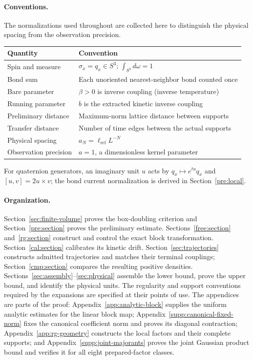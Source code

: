\paragraph{Conventions.}
The normalizations used throughout are collected here to distinguish the
physical spacing from the observation precision.
\begin{center}
\begin{tabular}{@{}ll@{}}
\toprule
Quantity & Convention\\
\midrule
Spin and measure & $\sigma_x=q_x\in S^3$; $\int_{S^3}d\omega=1$\\
Bond sum & Each unoriented nearest-neighbor bond counted once\\
Bare parameter & $\beta>0$ is inverse coupling (inverse temperature)\\
Running parameter & $b$ is the extracted kinetic inverse coupling\\
Preliminary distance & Maximum-norm lattice distance between supports\\
Transfer distance & Number of time edges between the actual supports\\
Physical spacing & $a_N=\ell_{\mathrm{ref}}L^{-N}$\\
Observation precision & $a=1$, a dimensionless kernel parameter\\
\bottomrule
\end{tabular}
\end{center}
For quaternion generators, an imaginary unit $u$ acts by
$q_x\mapsto e^{tu}q_x$ and $[u,v]=2u\times v$; the bond current
normalization is derived in Section~\ref{pre:local}.

\paragraph{Organization.}
Section~\ref{sec:finite-volume} proves the box-doubling criterion and
Section~\ref{pre:section} proves the preliminary estimate.
Sections~\ref{free:section} and~\ref{rg:section} construct and control
the exact block transformation. Section~\ref{cal:section} calibrates
its kinetic drift. Section~\ref{sec:trajectories} constructs admitted trajectories
and matches their terminal couplings; Section~\ref{cmp:section} compares the resulting
positive densities. Sections~\ref{sec:assembly}--\ref{sec:physical}
assemble the lower bound, prove the upper bound, and identify the
physical units. The regularity and support conventions required by the expansions are
specified at their points of use. The appendices are parts of the proof:
Appendix~\ref{app:analytic-block} supplies the uniform analytic estimates
for the linear block map; Appendix~\ref{supp:canonical-fixed-norm} fixes
the canonical coefficient norm and proves its diagonal contraction;
Appendix~\ref{app:rg-geometry} constructs the local factors and their
complete supports; and Appendix~\ref{supp:joint-majorants} proves the
joint Gaussian product bound and verifies it for all eight prepared-factor
classes.


